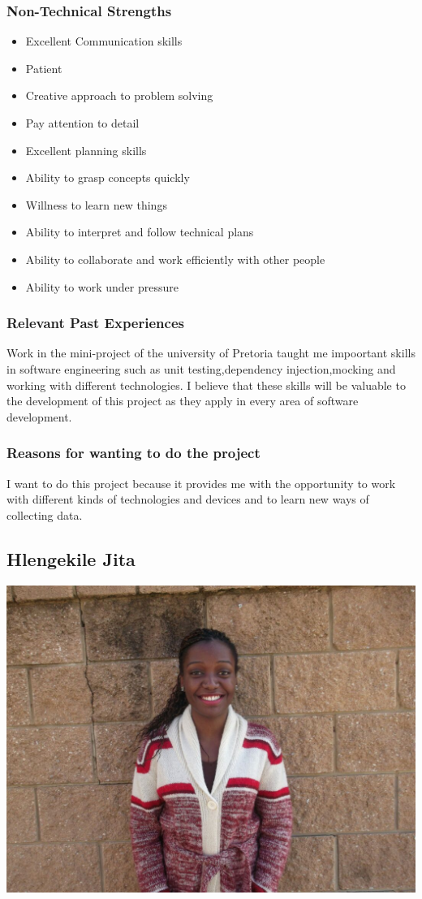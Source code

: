 \documentclass[a4paper,12pt]{article}
\begin{document}
\subsubsection{Non-Technical Strengths}
\begin{itemize}
\item Excellent Communication skills
\item Patient
\item Creative approach to problem solving
\item Pay attention to detail
\item Excellent planning skills
\item Ability to grasp concepts quickly
\item Willness to learn new things
\item Ability to interpret and follow technical plans
\item Ability to collaborate and work efficiently with other people
\item Ability to work under pressure
\end{itemize}
\subsubsection{Relevant Past Experiences}
Work in the mini-project of the university of Pretoria taught me impoortant skills in software engineering such as unit testing,dependency injection,mocking and working with different technologies. I believe that these skills will be valuable to the development of this project as they apply in every area of software development.
\subsubsection{Reasons for wanting to do the project}
I want to do this project because it provides me with the opportunity to work with different kinds of technologies and devices and to learn new ways of collecting data.
\newpage
\subsection{Hlengekile Jita}
\includegraphics[width=\textwidth]{images/Hlengi}
\end{document}
